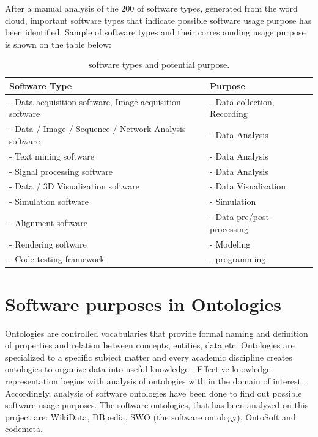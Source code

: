 After a manual analysis of the 200 of software types, generated from the word cloud, important software types that indicate possible software usage purpose has been identified. Sample of software types and their corresponding usage purpose is shown on the table below:

\begin{table}[h!]
	\begin{center}
		\caption{software types and potential purpose.}
		\label{tab:table1}
		\begin{tabular}{|l|l|} %
			\hline
			\textbf{Software Type} & \textbf{Purpose} \\
			\hline
			- Data acquisition software, Image acquisition software  & - Data collection, Recording  \\
			\hline
			- Data / Image  / Sequence  / Network  Analysis software  & - Data Analysis  \\
			\hline
			- Text mining software  & - Data Analysis  \\
			\hline
			- Signal processing software  & - Data Analysis  \\
			\hline
			- Data / 3D Visualization software & - Data Visualization  \\
			\hline
			- Simulation software  & - Simulation  \\
			\hline
			- Alignment software  & - Data pre/post-processing \\
			\hline
			- Rendering software  & - Modeling  \\
			\hline
			-	Code testing framework   & - programming  \\
			\hline
		\end{tabular}
	\end{center}
\end{table}
\section{Software purposes in Ontologies}

Ontologies are controlled vocabularies that provide formal naming and definition of properties and relation between concepts, entities, data etc.  Ontologies  are specialized  to a specific subject matter and every academic discipline creates ontologies to organize data into useful knowledge \citep{enwiki:1060388948}. 
Effective knowledge representation begins with analysis of ontologies with in the domain of interest \citep{chandrasekaran1999ontologies}. Accordingly, analysis of software ontologies have been done to find out possible software usage purposes. The software ontologies, that has been analyzed on this project are: WikiData, DBpedia, SWO (the software ontology), OntoSoft and codemeta.  
